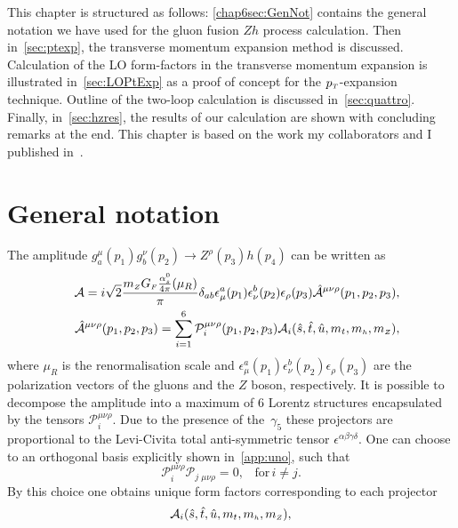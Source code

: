 \par This chapter is structured as follows: \autoref{chap6sec:GenNot} contains the general notation we have used for the gluon fusion $Zh$ process calculation. Then in~\autoref{sec:ptexp}, the transverse momentum expansion method is discussed.  Calculation of the LO form-factors in the transverse momentum expansion is illustrated in~\autoref{sec:LOPtExp} as a proof of concept for the $p_{\scriptscriptstyle T}$-expansion technique. Outline of the two-loop calculation is discussed in~\autoref{sec:quattro}. Finally, in~\autoref{sec:hzres}, the results of our calculation are shown with concluding remarks at the end.  This chapter is based on the work my collaborators and I published in~\cite{Alasfar:2021ppe}. 
\section{General notation \label{chap6sec:GenNot} }
\par The amplitude  $g^\mu_a(p_1)g^\nu_b(p_2)\to Z^\rho(p_3) h(p_4)$ can be written as
\begin{align}
&&{\cal A}=i \sqrt{2}\frac{m_{ \scriptscriptstyle Z} G_{ \scriptscriptstyle F} \frac{\alpha_s^0}{4 \pi}(\mu_R)}{\pi}\delta_{ab}\epsilon^a_\mu(p_1)
\epsilon^b_\nu(p_2)\epsilon_\rho(p_3)\hat{{\cal A}}^{\mu\nu\rho}(p_1,p_2,p_3 ),\\
&&\hat{{\cal A}}^{\mu\nu\rho}(p_1,p_2,p_3 )=\sum_{i=1}^{6}
\mathcal{P}_i^{\mu\nu\rho}(p_1,p_2,p_3 )
{\cal A}_i(\hat{s},\hat{t},\hat{u},m_t,m_{ \scriptscriptstyle h},m_{ \scriptscriptstyle Z}),
\label{eq:amp}
\end{align}
where  $\mu_R$ is the renormalisation scale and
$\epsilon^a_\mu(p_1)\epsilon^b_\nu(p_2)\epsilon_\rho(p_3)$ are the
polarization vectors of the gluons and the $Z$ boson, respectively.  It is possible to decompose the amplitude into a maximum of $6$ Lorentz structures encapsulated by the 
tensors $\mathcal{P}_i^{\mu\nu\rho}$. Due to the presence of the~$\gamma_5$ these projectors are
proportional to the Levi-Civita total anti-symmetric tensor
$\epsilon^{\alpha\beta\gamma\delta}$. One can choose to an orthogonal basis explicitly shown in~\autoref{app:uno}, such that
\begin{equation}
	\mathcal{P}_i^{\mu\nu\rho} \mathcal{P}_j\,_{\mu\nu\rho} = 0, \,\,\, \,\, \text{for}\, i \neq j .
\end{equation}
By this choice one obtains unique form factors corresponding to each projector
\begin{equation}
{\cal A}_i(\hat{s},\hat{t},\hat{u},m_t,m_{ \scriptscriptstyle h},m_{ \scriptscriptstyle Z}),
\end{equation}
